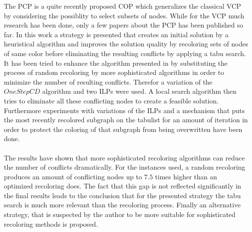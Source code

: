 
The PCP is a quite recently proposed COP which generalizes the classical VCP by considering the possiblity to select subsets of nodes. While for the VCP much research has been done, only a few papers about the PCP has been published so far. In this work a strategy is presented that creates an initial solution by a heuristical algorithm and improves the solution quality by recoloring sets of nodes of same color before eliminating the resulting conflicts by applying a tabu search. It has been tried to enhance the algorithm presented in \cite{noronha-06} by substituting the process of random recoloring by more sophisticated algorithms in order to minimize the number of resulting conflicts. Therefor a variation of the $\mathit{OneStepCD}$ algorithm \cite{li-00} and two ILPs were used. A local search algorithm then tries to eliminate all these conflicting nodes to create a feasible solution. Furthermore experiments with variations of the ILPs and a mechanism that puts the most recently recolored subgraph on the tabulist for an amount of iteration in order to protect the coloring of that subgraph from being overwritten have been done.\\\\
The results have shown that more sophisticated recoloring algorithms can reduce the number of conflicts dramatically. For the instances used, a random recoloring produces an amount of conflicting nodes up to $7.5$ times higher than an optimized recoloring does. The fact that this gap is not reflected significantly in the final results leads to the conclusion that for the presented strategy the tabu search is much more relevant than the recoloring process. Finally an alternative strategy, that is suspected by the author to be more suitable for sophisticated recoloring methods is proposed.
